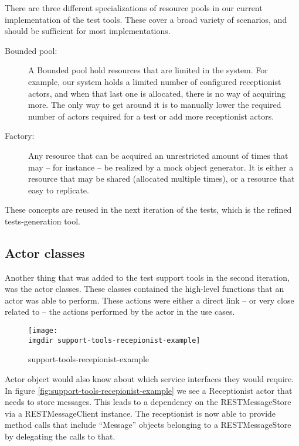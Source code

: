 \noindent There are three different specializations of resource pools in our current implementation of the test tools. These cover a broad variety of scenarios, and should be sufficient for most implementations.
\begin{description}
  \item[Bounded pool:] A Bounded pool hold resources that are limited in the system. For example, our system holds a limited number of configured receptionist actors, and when that last one is allocated, there is no way of acquiring more. The only way to get around it is to manually lower the required number of actors required for a test or add more receptionist actors.
  \item[Factory:] Any resource that can be acquired an unrestricted amount of times that may -- for instance -- be realized by a mock object generator. It is either a resource that may be shared (allocated multiple times), or a resource that easy to replicate.
\end{description}
These concepts are reused in the next iteration of the tests, which is the refined tests-generation tool.

\subsection{Actor classes}
Another thing that was added to the test support tools in the second iteration, was the actor classes. These classes contained the high-level functions that an actor was able to perform. These actions were either a direct link -- or very close related to -- the actions performed by the actor in the use cases.\medskip

\begin{figure}[!htbp]
 \centering
 \texttt{[image: \\imgdir support-tools-recepionist-example]}
 \caption{support-tools-recepionist-example}
 \label{fig:Example composition of a receptionist actor class}
\end{figure}

\noindent Actor object would also know about which service interfaces they would require. In figure \ref{fig:support-tools-recepionist-example} we see a Receptionist actor that needs to store messages. This leads to a dependency on the RESTMessageStore via a RESTMessageClient instance. The receptionist is now able to provide method calls that include ``Message'' objects belonging to a RESTMessageStore by delegating the calls to that.

